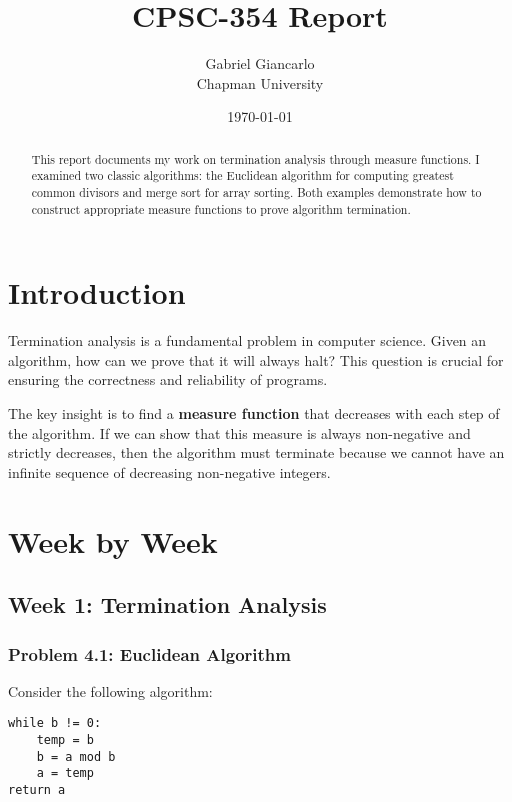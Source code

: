\documentclass{article}
\title{CPSC-354 Report}
\author{Gabriel Giancarlo \\ Chapman University}
\date{\today}
\theoremstyle{plain}
\theoremstyle{definition}
\theoremstyle{remark}
\begin{document}
\maketitle

\begin{abstract}
This report documents my work on termination analysis through measure functions. I examined two classic algorithms: the Euclidean algorithm for computing greatest common divisors and merge sort for array sorting. Both examples demonstrate how to construct appropriate measure functions to prove algorithm termination.
\end{abstract}

\setcounter{tocdepth}{3}
\tableofcontents

\section{Introduction}\label{intro}

Termination analysis is a fundamental problem in computer science. Given an algorithm, how can we prove that it will always halt? This question is crucial for ensuring the correctness and reliability of programs. 

The key insight is to find a \textbf{measure function} that decreases with each step of the algorithm. If we can show that this measure is always non-negative and strictly decreases, then the algorithm must terminate because we cannot have an infinite sequence of decreasing non-negative integers.

\section{Week by Week}\label{homework}

\subsection{Week 1: Termination Analysis}

\subsubsection{Problem 4.1: Euclidean Algorithm}

Consider the following algorithm:

\begin{verbatim}
while b != 0:
    temp = b
    b = a mod b
    a = temp
return a
\end{verbatim}
\end{document}

